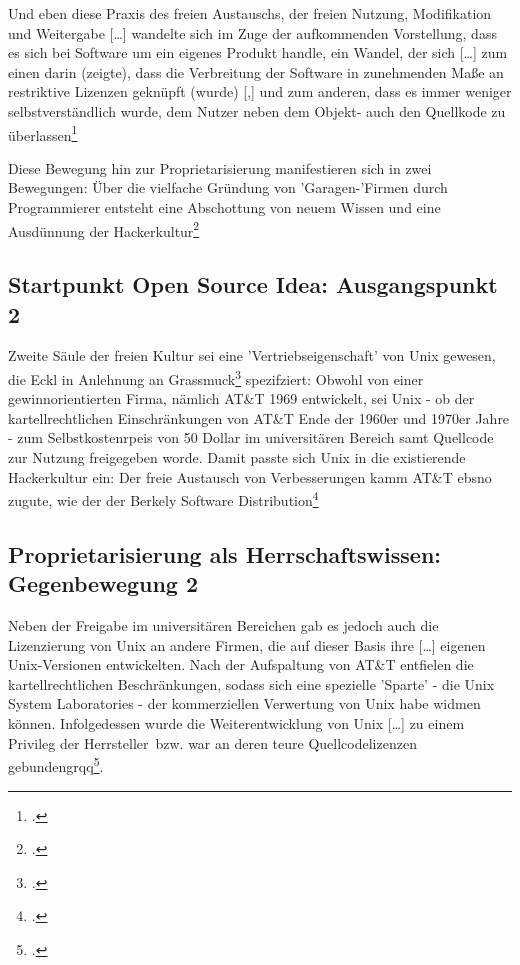 \documentclass[DIV=calc,BCOR=5mm,11pt,headings=small,oneside,abstract=true, toc=bib]{scrartcl}
\begin{document}
Und eben diese \glqq{}Praxis\grqq{} des freien Austauschs, der freien Nutzung,
Modifikation und Weitergabe \glqq{}[\ldots] wandelte sich im Zuge der
aufkommenden Vorstellung, dass es sich bei Software um ein eigenes Produkt
handle\grqq{}, ein Wandel, der sich \glqq{}[\ldots] zum einen darin
(zeigte), dass die Verbreitung der Software in zunehmenden Maße an
restriktive Lizenzen geknüpft (wurde) [,] und zum anderen, dass es immer
weniger selbstverständlich wurde, dem Nutzer neben dem Objekt- auch den
Quellkode zu überlassen\grqq{}\footcite[vgl.][102]{Eckl2004a}

Diese Bewegung hin zur Proprietarisierung manifestieren sich in zwei Bewegungen:
Über die vielfache Gründung von \glqq{}'Garagen-'Firmen\grqq{} durch
Programmierer entsteht eine \glqq{}Abschottung von neuem Wissen\grqq{} und eine
Ausdünnung der \glqq{}Hackerkultur\grqq{}\footcite[vgl.][103]{Eckl2004a}

\subsection{Startpunkt Open Source Idea: Ausgangspunkt 2}

Zweite Säule der freien Kultur sei eine 'Vertriebseigenschaft' von Unix gewesen,
die Eckl in Anlehnung an Grassmuck\footcite[vgl.][105 Anm 306]{Eckl2004a}
spezifziert: Obwohl von einer gewinnorientierten Firma, nämlich AT\&T
1969 entwickelt, sei Unix - ob der kartellrechtlichen Einschränkungen von AT\&T
Ende der 1960er und 1970er Jahre - zum \glqq{}Selbstkostenrpeis von 50
Dollar\grqq{} im universitären Bereich samt Quellcode zur Nutzung freigegeben
worde. Damit passte sich Unix in die existierende Hackerkultur ein: Der freie
Austausch von Verbesserungen kamm AT\&T ebsno zugute, wie der der \glqq{}Berkely
Software Distribution\grqq{}\footcite[vgl.][105f]{Eckl2004a}

\subsection{Proprietarisierung als Herrschaftswissen: Gegenbewegung 2}

Neben der Freigabe im universitären Bereichen gab es jedoch auch die
Lizenzierung von Unix an andere Firmen, die auf dieser Basis ihre
\glqq{}[\ldots] eigenen Unix-Versionen entwickelten\grqq{}. Nach der
\glqq{}Aufspaltung\grqq{} von AT\&T entfielen die kartellrechtlichen
Beschränkungen, sodass sich eine spezielle 'Sparte' - die \glqq{}Unix System
Laboratories\grqq{} - der \glqq{}kommerziellen Verwertung von
Unix\grqq{} habe widmen können. Infolgedessen wurde die Weiterentwicklung von
Unix \glqq{}[\ldots] zu einem Privileg der Herrsteller\ bzw. war an deren
teure Quellcodelizenzen gebundengrqq{}\footcite[vgl.][106]{Eckl2004a}.
\end{document}
